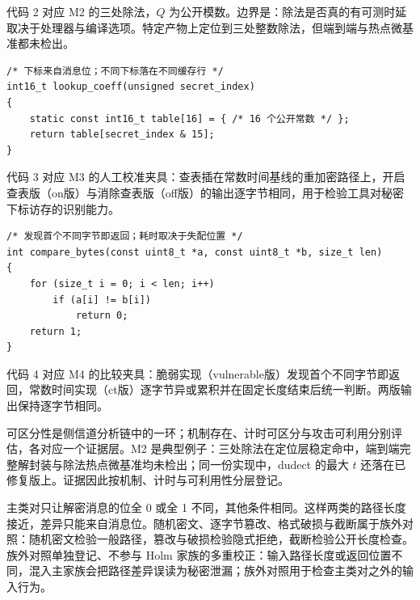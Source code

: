 代码 2 对应 M2 的三处除法，$Q$ 为公开模数。边界是：除法是否真的有可测时延取决于处理器与编译选项。特定产物上定位到三处整数除法，但端到端与热点微基准都未检出。

\noindent\begin{minipage}{\linewidth}
\begin{lstlisting}[caption={秘密下标查表的最小形态},label={code:lookup}]
/* 下标来自消息位；不同下标落在不同缓存行 */
int16_t lookup_coeff(unsigned secret_index)
{
    static const int16_t table[16] = { /* 16 个公开常数 */ };
    return table[secret_index & 15];
}
\end{lstlisting}
\end{minipage}

代码 3 对应 M3 的人工校准夹具：查表插在常数时间基线的重加密路径上，开启查表版（on版）与消除查表版（off版）的输出逐字节相同，用于检验工具对秘密下标访存的识别能力。

\noindent\begin{minipage}{\linewidth}
\begin{lstlisting}[caption={提前返回比较的最小形态},label={code:early}]
/* 发现首个不同字节即返回；耗时取决于失配位置 */
int compare_bytes(const uint8_t *a, const uint8_t *b, size_t len)
{
    for (size_t i = 0; i < len; i++)
        if (a[i] != b[i])
            return 0;
    return 1;
}
\end{lstlisting}
\end{minipage}

代码 4 对应 M4 的比较夹具：脆弱实现（vulnerable版）发现首个不同字节即返回，常数时间实现（ct版）逐字节异或累积并在固定长度结束后统一判断。两版输出保持逐字节相同。

可区分性是侧信道分析链中的一环；机制存在、计时可区分与攻击可利用分别评估，各对应一个证据层。M2 是典型例子：三处除法在定位层稳定命中，端到端完整解封装与除法热点微基准均未检出；同一份实现中，dudect 的最大 $t$ 还落在已修复版上。证据因此按机制、计时与可利用性分层登记。

主类对只让解密消息的位全 0 或全 1 不同，其他条件相同。这样两类的路径长度接近，差异只能来自消息位。随机密文、逐字节篡改、格式破损与截断属于族外对照：随机密文检验一般路径，篡改与破损检验隐式拒绝，截断检验公开长度检查。族外对照单独登记、不参与 Holm 家族的多重校正：输入路径长度或返回位置不同，混入主家族会把路径差异误读为秘密泄漏；族外对照用于检查主类对之外的输入行为。

